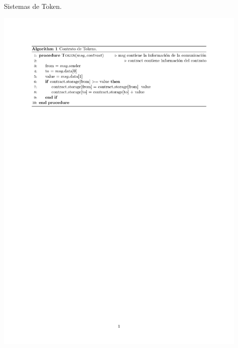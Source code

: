 \documentclass[usenames,dvipsnames]{beamer}
\begin{document}
\begin{frame}{ Sistemas de Token. }
	
\includegraphics[height=17.5cm]{./images/alg1.png}
\end{frame}
\end{document}

